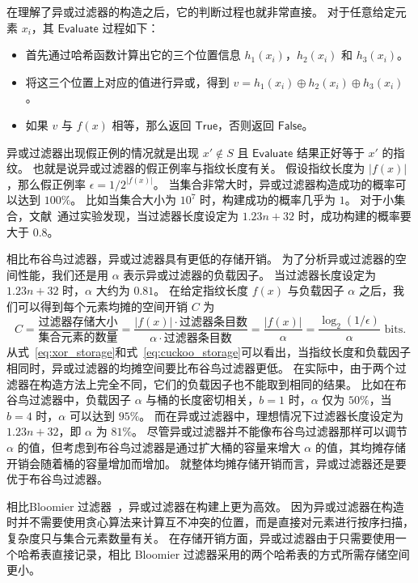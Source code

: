 在理解了异或过滤器的构造之后，它的判断过程也就非常直接。
对于任意给定元素 $x_i$，其 $\mathsf{Evaluate}$ 过程如下：
\begin{itemize}
  \item 首先通过哈希函数计算出它的三个位置信息 $h_1(x_i)$，$h_2(x_i)$ 和 $h_3(x_i)$。
  \item 将这三个位置上对应的值进行异或，得到 $v = h_1(x_i) \oplus h_2(x_i) \oplus h_3(x_i)$。
  \item 如果 $v$ 与 $f(x)$ 相等，那么返回 $\mathsf{True}$，否则返回 $\mathsf{False}$。
\end{itemize}

异或过滤器出现假正例的情况就是出现 $x'\notin S$ 且 $\mathsf{Evaluate}$ 结果正好等于 $x'$ 的指纹。
也就是说异或过滤器的假正例率与指纹长度有关。
假设指纹长度为 $|f(x)|$，那么假正例率 $\epsilon = 1 / 2^{|f(x)|}$。
当集合非常大时，异或过滤器构造成功的概率可以达到 $100\%$。
比如当集合大小为 $10^7$ 时，构建成功的概率几乎为 $1$。
对于小集合，文献~\cite{graf2020xor}通过实验发现，当过滤器长度设定为 $1.23 n + 32$ 时，成功构建的概率要大于 $0.8$。

相比布谷鸟过滤器，异或过滤器具有更低的存储开销。
为了分析异或过滤器的空间性能，我们还是用 $\alpha$ 表示异或过滤器的负载因子。
当过滤器长度设定为 $1.23n + 32$ 时，$\alpha$ 大约为 $0.81$。
在给定指纹长度 $f(x)$ 与负载因子 $\alpha$ 之后，我们可以得到每个元素均摊的空间开销 $C$ 为
\begin{equation}
  C = \frac{\mbox{过滤器存储大小}}{\mbox{集合元素的数量}} = \frac{|f(x)| \cdot \mbox{过滤器条目数}}{\alpha \cdot \mbox{过滤器条目数}} = \frac{|f(x)|}{\alpha} = \frac{\log_2(1/\epsilon)}{\alpha} \mbox{ bits}.
  \label{eq:xor_storage}
\end{equation}
从式~\ref{eq:xor_storage}和式~\ref{eq:cuckoo_storage}可以看出，当指纹长度和负载因子相同时，异或过滤器的均摊空间要比布谷鸟过滤器更低。
在实际中，由于两个过滤器在构造方法上完全不同，它们的负载因子也不能取到相同的结果。
比如在布谷鸟过滤器中，负载因子 $\alpha$ 与桶的长度密切相关，$b=1$ 时，$\alpha$ 仅为 $50\%$，当 $b=4$ 时，$\alpha$ 可以达到 $95\%$。
而在异或过滤器中，理想情况下过滤器长度设定为 $1.23n + 32$，即 $\alpha$ 为 $81\%$。
尽管异或过滤器并不能像布谷鸟过滤器那样可以调节 $\alpha$ 的值，但考虑到布谷鸟过滤器是通过扩大桶的容量来增大 $\alpha$ 的值，其均摊存储开销会随着桶的容量增加而增加。
就整体均摊存储开销而言，异或过滤器还是要优于布谷鸟过滤器。


相比Bloomier 过滤器~\cite{chazelle2004bloomier}，异或过滤器在构建上更为高效。
因为异或过滤器在构造时并不需要使用贪心算法来计算互不冲突的位置，而是直接对元素进行按序扫描，复杂度只与集合元素数量有关。
在存储开销方面，异或过滤器由于只需要使用一个哈希表直接记录，相比 Bloomier 过滤器采用的两个哈希表的方式所需存储空间更小。


